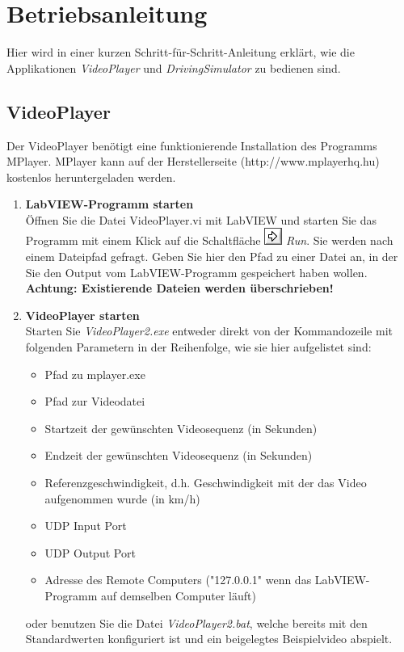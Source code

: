 \section{Betriebsanleitung}
Hier wird in einer kurzen Schritt-für-Schritt-Anleitung erklärt, wie die Applikationen \textit{VideoPlayer} und \textit{DrivingSimulator} zu bedienen sind.
\subsection{VideoPlayer}
Der VideoPlayer benötigt eine funktionierende Installation des Programms MPlayer. MPlayer kann auf der Herstellerseite (http://www.mplayerhq.hu) kostenlos heruntergeladen werden.

\begin{enumerate}[label=\arabic*.]

\item \textbf{LabVIEW-Programm starten}\\
Öffnen Sie die Datei VideoPlayer.vi mit LabVIEW und starten Sie das Programm mit einem Klick auf die Schaltfläche \includegraphics[height=\ht\strutbox]{src/icon_labview_run.png} \textit{Run}. Sie werden nach einem Dateipfad gefragt. Geben Sie hier den Pfad zu einer Datei an, in der Sie den Output vom LabVIEW-Programm gespeichert haben wollen. \textbf{Achtung: Existierende Dateien werden überschrieben!}

\item \textbf{VideoPlayer starten}\\
Starten Sie \textit{VideoPlayer2.exe} entweder direkt von der Kommandozeile mit folgenden Parametern in der Reihenfolge, wie sie hier aufgelistet sind:
\begin{itemize}
	\item Pfad zu mplayer.exe
	\item Pfad zur Videodatei
	\item Startzeit der gewünschten Videosequenz (in Sekunden)
	\item Endzeit der gewünschten Videosequenz (in Sekunden)
	\item Referenzgeschwindigkeit, d.h. Geschwindigkeit mit der das Video aufgenommen wurde (in km/h)
	\item UDP Input Port
	\item UDP Output Port
	\item Adresse des Remote Computers ("127.0.0.1" wenn das LabVIEW-Programm auf demselben Computer läuft)
\end{itemize}
oder benutzen Sie die Datei \textit{VideoPlayer2.bat}, welche bereits mit den Standardwerten konfiguriert ist und ein beigelegtes Beispielvideo abspielt.
	

\end{enumerate}
